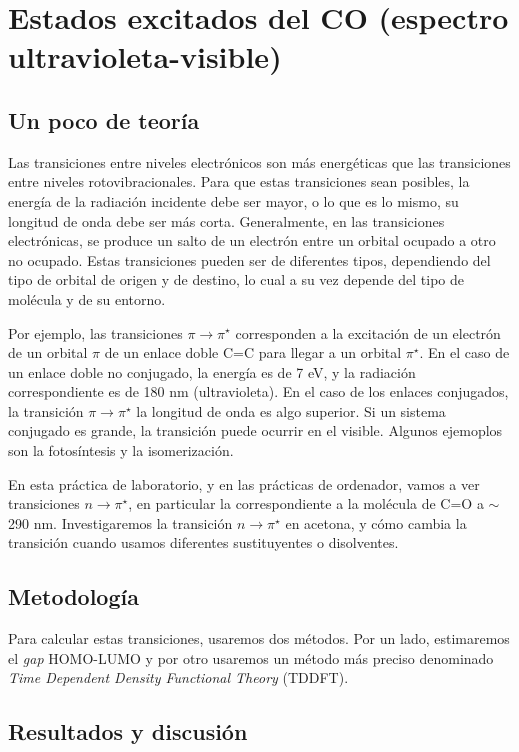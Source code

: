 \documentclass{tufte-book}
\begin{document}
\chapter{Estados excitados del CO (espectro ultravioleta-visible)}
\section{Un poco de teoría}
Las transiciones entre niveles electrónicos son más energéticas
que las transiciones entre niveles rotovibracionales. Para que
estas transiciones sean posibles, la energía de la radiación 
incidente debe ser mayor, o lo que es lo mismo, su longitud de
onda debe ser más corta. Generalmente, en las transiciones 
electrónicas, se produce un salto de un electrón entre 
un orbital ocupado a otro no ocupado. Estas transiciones pueden
ser de diferentes tipos, dependiendo del tipo de orbital de origen 
y de destino, lo cual a su vez depende del tipo de molécula y de su
entorno.

Por ejemplo, las transiciones $\pi\rightarrow\pi^\star$ 
corresponden a la excitación de un electrón de un orbital 
$\pi$ de un enlace doble C=C para llegar a un orbital 
$\pi^\star$. En el caso de un enlace doble no conjugado,
la energía  es de 7 eV, y la radiación correspondiente
es de 180 nm (ultravioleta). En el caso de los enlaces
conjugados, la transición $\pi\rightarrow\pi^\star$
la longitud de onda es algo superior. Si un sistema
conjugado es grande, la transición puede ocurrir en
el visible. Algunos ejemoplos son la fotosíntesis y 
la isomerización. 

En esta práctica de laboratorio, y en las prácticas de 
ordenador, vamos a ver transiciones $n\rightarrow\pi^\star$,
en particular la correspondiente a la molécula de C=O
a $\sim$290 nm. Investigaremos la transición 
$n\rightarrow\pi^\star$ en acetona, y cómo cambia la 
transición cuando usamos diferentes sustituyentes o 
disolventes.

\section{Metodología}
Para calcular estas transiciones, usaremos dos métodos.
Por un lado, estimaremos el \textit{gap} HOMO-LUMO y por
otro usaremos un método más preciso denominado \textit{
Time Dependent Density Functional Theory} (TDDFT).

\section{Resultados y discusión}
\end{document}
